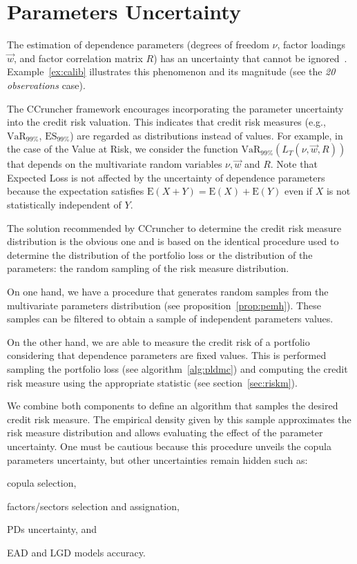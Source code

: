 \documentclass[11pt,fleqn]{book} %
\begin{document}
\section{Parameters Uncertainty}

The estimation of dependence parameters (degrees of freedom $\nu$, factor
loadings $\vec{w}$, and factor correlation matrix $R$) has an uncertainty 
that cannot be ignored~\cite{tarashev:2010,gossl:2005}. Example~\ref{ex:calib} 
illustrates this phenomenon and its magnitude (see the \emph{20 observations} 
case).

The CCruncher framework encourages incorporating the parameter uncertainty 
into the credit risk valuation. This indicates that credit risk measures
(e.g., $\text{VaR}_{99\%}$, $\text{ES}_{99\%}$) are regarded as distributions 
instead of values. For example, in the case of the Value at Risk, we consider
the function $\text{VaR}_{99\%}(L_T(\nu,\vec{w},R))$ that depends on 
the multivariate random variables $\nu, \vec{w}$ and $R$. Note that Expected 
Loss is not affected by the uncertainty of dependence parameters because the 
expectation satisfies $\text{E}(X+Y)=\text{E}(X)+\text{E}(Y)$ even if $X$ is 
not statistically independent of $Y$.

The solution recommended by CCruncher to determine the credit risk measure 
distribution is the obvious one and is based on the identical procedure 
used to determine the distribution of the portfolio loss or the distribution 
of the parameters: the random sampling of the risk measure distribution. 

On one hand, we have a procedure that generates random samples from the 
multivariate parameters distribution (see proposition~\ref{prop:pemh}).
These samples can be filtered to obtain a sample of independent parameters 
values.

On the other hand, we are able to measure the credit risk of a portfolio 
considering that dependence parameters are fixed values. This is performed 
sampling the portfolio loss (see algorithm~\ref{alg:pldmc}) and computing 
the credit risk measure using the appropriate statistic (see 
section~\ref{sec:riskm}).

We combine both components to define an algorithm that samples the desired
credit risk measure. The empirical density given by this sample 
approximates the risk measure distribution and allows evaluating the 
effect of the parameter uncertainty. One must be cautious because this 
procedure unveils the copula parameters uncertainty, but other uncertainties
remain hidden such as:
\begin{inparaenum}[1)]
	\item copula selection, 
	\item factors/sectors selection and assignation,
	\item PDs uncertainty, and
	\item EAD and LGD models accuracy.
\end{inparaenum}
\end{document}
